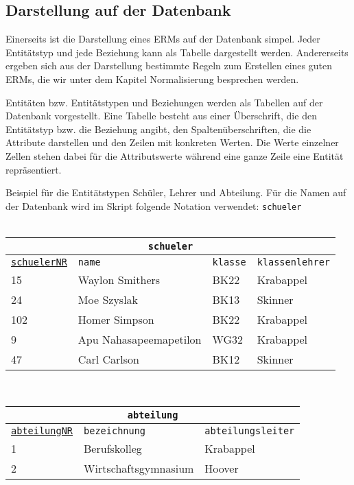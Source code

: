 \subsection[Darstellung auf der DB]{Darstellung auf der Datenbank}
Einerseits ist die Darstellung eines ERMs auf der Datenbank simpel. Jeder Entitätstyp und jede Beziehung kann als Tabelle dargestellt werden. Andererseits ergeben sich aus der Darstellung bestimmte Regeln zum Erstellen eines guten ERMs, die wir unter dem Kapitel Normalisierung besprechen werden.\\
\begin{tcolorbox}[title=Entitäten/-typen und Beziehungen auf der Datenbank]
	Entitäten bzw. Entitätstypen und Beziehungen werden als Tabellen auf der Datenbank vorgestellt. Eine Tabelle besteht aus einer Überschrift, die den Entitätstyp bzw. die Beziehung angibt, den Spaltenüberschriften, die die Attribute darstellen und den Zeilen mit konkreten Werten. Die Werte einzelner Zellen stehen dabei für die Attributswerte während eine ganze Zeile eine Entität repräsentiert.
\end{tcolorbox}
Beispiel für die Entitätstypen Schüler, Lehrer und Abteilung. Für die Namen auf der Datenbank wird im Skript folgende Notation verwendet: \lstinline!schueler!\\\phantom{ }\\
\begin{tabular}{llll}
	\multicolumn{4}{c}{\lstinline!schueler!}\\
	\hline
	\underline{\lstinline!schuelerNR!}&\lstinline!name!&\lstinline!klasse!&\lstinline!klassenlehrer!\\
	\hline
	15&Waylon Smithers&BK22&Krabappel\\
	24&Moe Szyslak&BK13&Skinner\\
	102&Homer Simpson&BK22&Krabappel\\
	9&Apu Nahasapeemapetilon&WG32&Krabappel\\
	47&Carl Carlson&BK12&Skinner\\
\end{tabular}\\
\begin{tabular}{lll}
	\multicolumn{3}{c}{\lstinline!abteilung!}\\
	\hline
	\underline{\lstinline!abteilungNR!}&\lstinline!bezeichnung!&\lstinline!abteilungsleiter!\\
	\hline
	1&Berufskolleg&Krabappel\\
	2&Wirtschaftsgymnasium&Hoover\\
\end{tabular}\\
